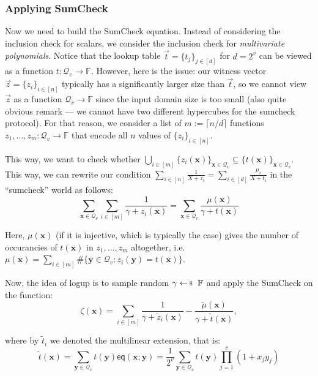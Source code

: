 \documentclass[../../book]{subfiles}
\begin{document}
\subsubsection{Applying SumCheck}

Now we need to build the SumCheck equation. Instead of considering the inclusion
check for scalars, we consider the inclusion check for \textit{multivariate
polynomials}. Notice that the lookup table $\vec{t} = \{t_j\}_{j \in [d]}$ for
$d=2^v$ can be viewed as a function $t: \mathcal{Q}_v \to \mathbb{F}$. However,
here is the issue: our witness vector $\vec{z} = \{z_i\}_{i \in [n]}$ typically
has a significantly larger size than $\vec{t}$, so we cannot view $\vec{z}$ as a
function $\mathcal{Q}_v \to \mathbb{F}$ since the input domain size is too small
(also quite obvious remark --- we cannot have two different hypercubes for the
sumcheck protocol). For that reason, we consider a list of $m := \lceil n/d
\rceil$ functions $z_1,\dots,z_m: \mathcal{Q}_v \to \mathbb{F}$ that encode all
$n$ values of $\{z_i\}_{i \in [n]}$.

This way, we want to check whether $\bigcup_{i \in
[m]}\{z_i(\mathbf{x})\}_{\mathbf{x} \in \mathcal{Q}_v} \subseteq
\{t(\mathbf{x})\}_{\mathbf{x} \in \mathcal{Q}_v}$. This way, we can rewrite our
condition $\sum_{i \in [n]} \frac{1}{X+z_i} = \sum_{i \in [d]}
\frac{\mu_i}{X+t_i}$ in the ``sumcheck'' world as follows:
\begin{equation*}
    \sum_{\mathbf{x} \in \mathcal{Q}_v}\sum_{i \in [m]} \frac{1}{\gamma + z_i(\mathbf{x})} = \sum_{\mathbf{x} \in \mathcal{Q}_v} \frac{\mu(\mathbf{x})}{\gamma + t(\mathbf{x})}
\end{equation*}

Here, $\mu(\mathbf{x})$ (if it is injective, which is typically the case) gives the
number of occurancies of $t(\mathbf{x})$ in $z_1,\dots,z_m$ altogether, i.e.
$\mu(\mathbf{x}) = \sum_{i \in [m]}\#\{\mathbf{y} \in \mathcal{Q}_v:
z_i(\mathbf{y}) = t(\mathbf{x})\}$.

Now, the idea of logup is to sample random $\gamma \leftarrowS \mathbb{F}$ and 
apply the SumCheck on the function:
\begin{equation*}
    \zeta(\mathbf{x}) = \sum_{i \in [m]} \frac{1}{\gamma + \widetilde{z}_i(\mathbf{x})} - \frac{\widetilde{\mu}(\mathbf{x})}{\gamma + \widetilde{t}(\mathbf{x})},
\end{equation*}

where by $\widetilde{t}_i$ we denoted the multilinear extension, that is:
\begin{equation*}
\widetilde{t}(\mathbf{x}) = \sum_{\mathbf{y} \in \mathcal{Q}_v}
t(\mathbf{y})\mathsf{eq}(\mathbf{x}; \mathbf{y}) = \frac{1}{2^v}\sum_{\mathbf{y} \in \mathcal{Q}_v}t(\mathbf{y})\prod_{j=1}^v(1+x_jy_j) 
\end{equation*}
\end{document}
